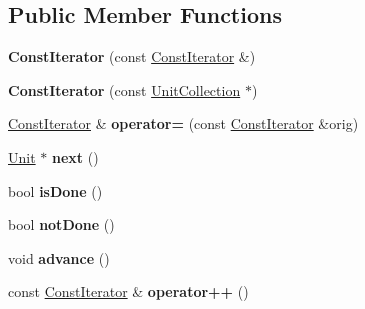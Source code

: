 \subsection*{Public Member Functions}
\begin{DoxyCompactItemize}
\item 
{\bfseries Const\+Iterator} (const \hyperlink{classUnitCollection_1_1ConstIterator}{Const\+Iterator} \&)\hypertarget{classUnitCollection_1_1ConstIterator_aa61cb97e84dece1be7683fc01b0aa93e}{}\label{classUnitCollection_1_1ConstIterator_aa61cb97e84dece1be7683fc01b0aa93e}

\item 
{\bfseries Const\+Iterator} (const \hyperlink{classUnitCollection}{Unit\+Collection} $\ast$)\hypertarget{classUnitCollection_1_1ConstIterator_a7c2c0ac6d3005608b4032bbb19264cca}{}\label{classUnitCollection_1_1ConstIterator_a7c2c0ac6d3005608b4032bbb19264cca}

\item 
\hyperlink{classUnitCollection_1_1ConstIterator}{Const\+Iterator} \& {\bfseries operator=} (const \hyperlink{classUnitCollection_1_1ConstIterator}{Const\+Iterator} \&orig)\hypertarget{classUnitCollection_1_1ConstIterator_a8ac6664fea0d96f806a1c47fecdff211}{}\label{classUnitCollection_1_1ConstIterator_a8ac6664fea0d96f806a1c47fecdff211}

\item 
\hyperlink{classUnit}{Unit} $\ast$ {\bfseries next} ()\hypertarget{classUnitCollection_1_1ConstIterator_aea215c179ae9c58e2491b1a60271eb20}{}\label{classUnitCollection_1_1ConstIterator_aea215c179ae9c58e2491b1a60271eb20}

\item 
bool {\bfseries is\+Done} ()\hypertarget{classUnitCollection_1_1ConstIterator_a00d72f07a2d2df356cad7b3be66995f0}{}\label{classUnitCollection_1_1ConstIterator_a00d72f07a2d2df356cad7b3be66995f0}

\item 
bool {\bfseries not\+Done} ()\hypertarget{classUnitCollection_1_1ConstIterator_a210921ca03bc4c155593c940682a7d46}{}\label{classUnitCollection_1_1ConstIterator_a210921ca03bc4c155593c940682a7d46}

\item 
void {\bfseries advance} ()\hypertarget{classUnitCollection_1_1ConstIterator_a96279da6b6012957a586988577b33f07}{}\label{classUnitCollection_1_1ConstIterator_a96279da6b6012957a586988577b33f07}

\item 
const \hyperlink{classUnitCollection_1_1ConstIterator}{Const\+Iterator} \& {\bfseries operator++} ()\hypertarget{classUnitCollection_1_1ConstIterator_a9e4ba11777f92df2aa04355b29ae4e2f}{}\label{classUnitCollection_1_1ConstIterator_a9e4ba11777f92df2aa04355b29ae4e2f}


\end{DoxyCompactItemize}
